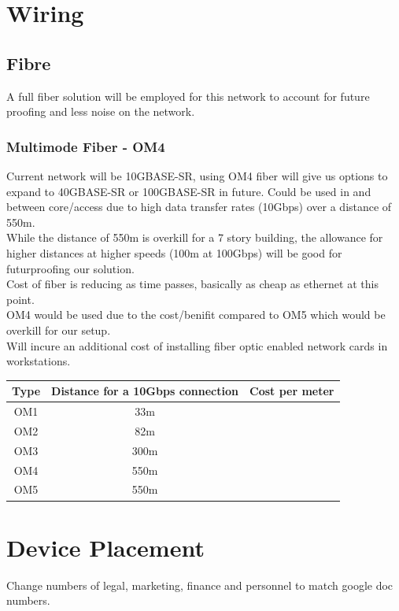 \section{Wiring}
\subsection{Fibre}
A full fiber solution will be employed for this network to account for future proofing and less noise on the network.
\subsubsection{Multimode Fiber - OM4}
Current network will be 10GBASE-SR, using OM4 fiber will give us options to expand to 40GBASE-SR or 100GBASE-SR in future.
Could be used in and between core/access due to high data transfer rates (10Gbps) over a distance of 550m.\\
While the distance of 550m is overkill for a 7 story building, the allowance for higher distances at higher speeds (100m at 100Gbps) will be good for futurproofing our solution.\\
Cost of fiber is reducing as time passes, basically as cheap as ethernet at this point.\\
OM4 would be used due to the cost/benifit compared to OM5 which would be overkill for our setup.\\
Will incure an additional cost of installing fiber optic enabled network cards in workstations.\\

\begin{table}[]
    \centering
    \begin{tabular}{|c|c|c|}
    \hline
    Type & Distance for a 10Gbps connection & Cost per meter \\ \hline
    OM1  & 33m                              &                \\ \hline
    OM2  & 82m                              &                \\ \hline
    OM3  & 300m                             &                \\ \hline
    OM4  & 550m                             &                \\ \hline
    OM5  & 550m                             &                \\ \hline
    \end{tabular}
\end{table}
\section{Device Placement}
Change numbers of legal, marketing, finance and personnel to match google doc numbers.

